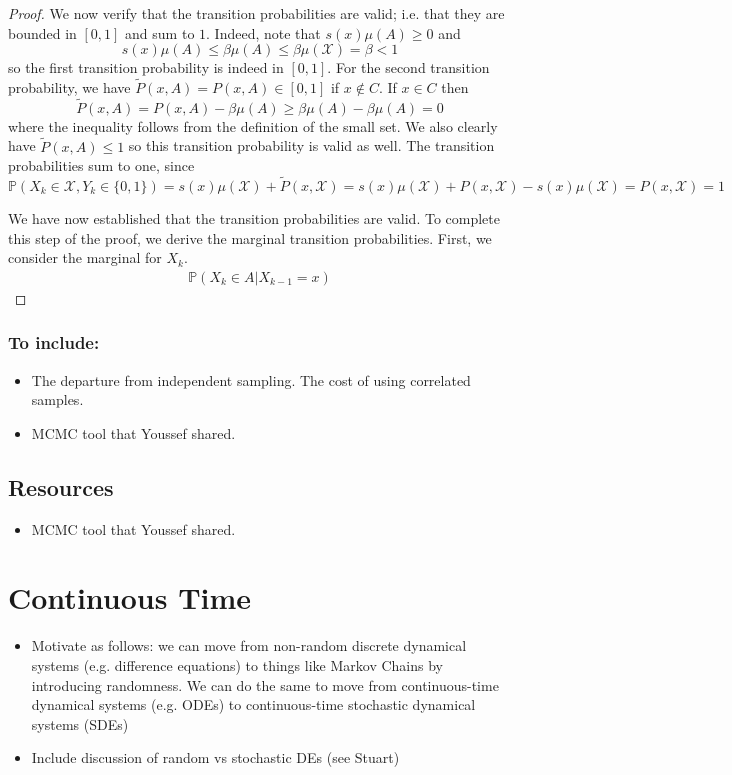 \documentclass[12pt]{article}
\newcommand{\Prob}{\mathbb{P}}
\begin{document}
\begin{proof}
We now verify that the transition probabilities are valid; i.e. that they are bounded in $[0, 1]$ and sum to $1$. Indeed, note that $s(x) \mu(A) \geq 0$ and 
\[s(x) \mu(A) \leq \beta \mu(A) \leq \beta \mu(\mathcal{X}) = \beta < 1\]
so the first transition probability is indeed in $[0, 1]$. For the second transition probability, we have $\tilde{P}(x, A) = P(x, A) \in [0, 1]$ if $x \notin C$. If $x \in C$ then 
\[\tilde{P}(x, A) = P(x, A) - \beta \mu(A) \geq \beta \mu(A) - \beta \mu(A) = 0\]
where the inequality follows from the definition of the small set. We also clearly have $\tilde{P}(x, A) \leq 1$ so this transition probability is valid as well. The transition probabilities sum to one, 
since 
\[\Prob(X_k \in \mathcal{X}, Y_k \in \{0, 1\}) = s(x)\mu(\mathcal{X}) + \tilde{P}(x, \mathcal{X}) = s(x)\mu(\mathcal{X}) + P(x, \mathcal{X}) - s(x)\mu(\mathcal{X}) =  P(x, \mathcal{X}) = 1\]

We have now established that the transition probabilities are valid. To complete this step of the proof, we derive the marginal transition probabilities. First, we consider the marginal for 
$X_k$. 
\begin{align*}
\Prob(X_k \in A|X_{k - 1} = x)
\end{align*}


\end{proof} 




\subsubsection{To include:}
\begin{itemize}
\item The departure from independent sampling. The cost of using correlated samples. 
\item MCMC tool that Youssef shared. 
\end{itemize}

\subsection{Resources}
\begin{itemize}
\item MCMC tool that Youssef shared. 
\end{itemize}









\section{Continuous Time}
\begin{itemize}
\item Motivate as follows: we can move from non-random discrete dynamical systems (e.g. difference equations) to things like Markov Chains by introducing randomness. We can do the 
same to move from continuous-time dynamical systems (e.g. ODEs) to continuous-time stochastic dynamical systems (SDEs) 
\item Include discussion of random vs stochastic DEs (see Stuart)
\end{itemize}
\end{document}
